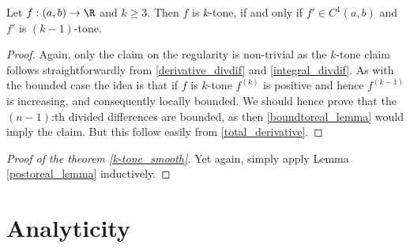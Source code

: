 \begin{lem}\label{postoreal_lemma}
	Let $f : (a, b) \to \R$ and $k \geq 3$. Then $f$ is $k$-tone, if and only if $f' \in C^{1}(a, b)$ and $f'$ is $(k - 1)$-tone.
\end{lem}
\begin{proof}
	Again, only the claim on the regularity is non-trivial as the $k$-tone claim follows straightforwardly from  \ref{derivative_divdif} and \ref{integral_divdif}. As with the bounded case the idea is that if $f$ is $k$-tone $f^{(k)}$ is positive and hence $f^{(k - 1)}$ is increasing, and consequently locally bounded. We should hence prove that the $(n - 1)$:th divided differences are bounded, as then \ref{boundtoreal_lemma} would imply the claim. But this follow easily from \ref{total_derivative}.
\end{proof}

\begin{proof}[Proof of the theorem \ref{k-tone_smooth}]
	Yet again, simply apply Lemma \ref{postoreal_lemma} inductively.
\end{proof}

\section{Analyticity}


